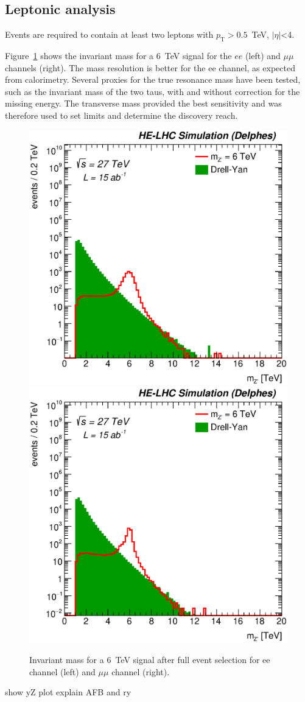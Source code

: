 \documentclass[14pt]{article}
\newcommand*{\pt}{\ensuremath{p_{\text{T}}}}
\begin{document}
\subsection{Leptonic analysis}
\label{subsection:lepana}
Events are required to contain at least two leptons with $\pt > 0.5$~TeV, $|\eta|$<4. 

Figure~\ref{figure:lepana:mass} shows the invariant mass for a 6~TeV signal for the $ee$ (left) and $\mu\mu$ channels (right). 
The mass resolution is better for the ee channel, as expected from calorimetry. 
Several proxies for the true resonance mass have been tested, such as the invariant mass of the two taus, with and without correction for the missing energy. The transverse mass provided the best sensitivity and was therefore used to set limits and determine the discovery reach.

\label{sec:lepana}
\begin{figure}[h]
  \centering
    \includegraphics[width=0.45\columnwidth]{figures/Zpmumu_mzp_sel0_nostack_log.eps}
    \includegraphics[width=0.45\columnwidth]{figures/Zpee_mzp_sel0_nostack_log.eps}
   \caption{Invariant mass for a 6~TeV signal after full event selection for ee channel (left) and $\mu\mu$ channel (right).}
  \label{figure:lepana:mass}
\end{figure}

show yZ plot
explain AFB and ry
\end{document}
